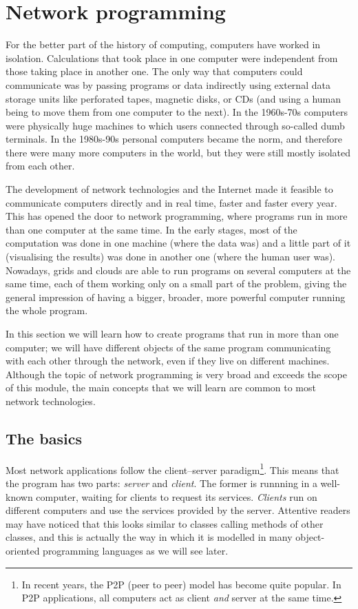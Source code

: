 \section{Network programming}
\label{sec:network-programming}

For the better part of the history of computing, computers have worked
in isolation. Calculations that took place in one computer were
independent from those taking place in another one. The only way that
computers could communicate was by passing programs or data 
indirectly using external data storage units
like perforated tapes, magnetic disks, or CDs (and using a human being
to move them from one computer to the next). 
%
In the 1960s-70s computers were physically huge machines to which
users connected through so-called dumb terminals. In the 1980s-90s
personal computers became the norm, and therefore there were many more
computers in the world, but they were still mostly isolated from each
other.

The development of network technologies and the Internet made it
feasible to communicate computers directly and in real time, faster
and faster every year. This has opened the door to network
programming, where programs run in more than one computer at the same
time. In the early stages, most of the computation was done in one
machine (where the data was) and a little part of it (visualising the
results) was done in another one (where the human user was). Nowadays,
grids and clouds are 
able to run programs on several computers at the same time, each of
them working only on a small part of 
the problem, giving the general impression
of having a bigger, broader, more powerful computer running the whole
program. 

In this section we will learn how to create programs that run in more
than one computer; we will have 
different objects of the same program communicating
with each other through the network, even if they live on different
machines. Although the topic of network programming is very broad and
exceeds the scope of this module, the main concepts that we
will learn are common to most network technologies. 

\subsection{The basics}
\label{sec:basics}

Most network applications follow the client--server
paradigm\footnote{In recent years, the P2P (peer to peer) model has
  become quite popular. In P2P applications, all computers act as client
  \emph{and} server at the same time.}. This means that the program has two 
parts: \emph{server} and \emph{client}. The former is
runnning in a well-known computer, waiting for clients to request its
services.  \emph{Clients} run on different computers and use the
services provided by the server. Attentive readers may have noticed
that this looks similar to classes calling methods of other classes,
and this is actually the way in which it is modelled in many
object-oriented programming languages as we will see later.


